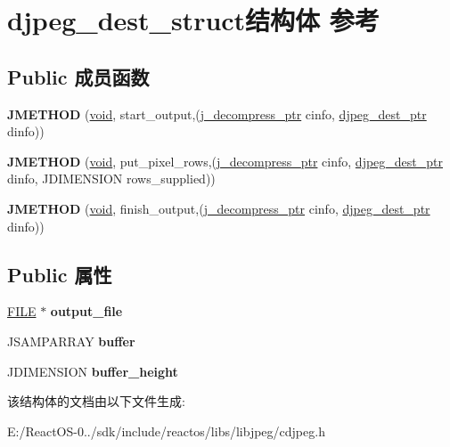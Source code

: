 \hypertarget{structdjpeg__dest__struct}{}\section{djpeg\+\_\+dest\+\_\+struct结构体 参考}
\label{structdjpeg__dest__struct}
\subsection*{Public 成员函数}
\begin{DoxyCompactItemize}
\item 
\mbox{\label{structdjpeg__dest__struct_a387aad15333be251b9fdd4f341e3b50c}} 
{\bfseries J\+M\+E\+T\+H\+OD} (\hyperlink{interfacevoid}{void}, start\+\_\+output,(\hyperlink{structjpeg__decompress__struct}{j\+\_\+decompress\+\_\+ptr} cinfo, \hyperlink{structdjpeg__dest__struct}{djpeg\+\_\+dest\+\_\+ptr} dinfo))
\item 
\mbox{\label{structdjpeg__dest__struct_ab7452265598106468aeb73b63c080024}} 
{\bfseries J\+M\+E\+T\+H\+OD} (\hyperlink{interfacevoid}{void}, put\+\_\+pixel\+\_\+rows,(\hyperlink{structjpeg__decompress__struct}{j\+\_\+decompress\+\_\+ptr} cinfo, \hyperlink{structdjpeg__dest__struct}{djpeg\+\_\+dest\+\_\+ptr} dinfo, J\+D\+I\+M\+E\+N\+S\+I\+ON rows\+\_\+supplied))
\item 
\mbox{\label{structdjpeg__dest__struct_a3a1f7c965ea1dbbb577eb8902e3c893e}} 
{\bfseries J\+M\+E\+T\+H\+OD} (\hyperlink{interfacevoid}{void}, finish\+\_\+output,(\hyperlink{structjpeg__decompress__struct}{j\+\_\+decompress\+\_\+ptr} cinfo, \hyperlink{structdjpeg__dest__struct}{djpeg\+\_\+dest\+\_\+ptr} dinfo))
\end{DoxyCompactItemize}
\subsection*{Public 属性}
\begin{DoxyCompactItemize}
\item 
\mbox{\label{structdjpeg__dest__struct_a5cd2d9d83c2b0b77b30169be5682d8fc}} 
\hyperlink{struct__iobuf}{F\+I\+LE} $\ast$ {\bfseries output\+\_\+file}
\item 
\mbox{\label{structdjpeg__dest__struct_a84d1443492d9c70afae65d6f95410cf4}} 
J\+S\+A\+M\+P\+A\+R\+R\+AY {\bfseries buffer}
\item 
\mbox{\label{structdjpeg__dest__struct_a78eef05ab5286600c995e9df51acf2c1}} 
J\+D\+I\+M\+E\+N\+S\+I\+ON {\bfseries buffer\+\_\+height}
\end{DoxyCompactItemize}


该结构体的文档由以下文件生成\+:\begin{DoxyCompactItemize}
\item 
E\+:/\+React\+O\+S-\/0../sdk/include/reactos/libs/libjpeg/cdjpeg.\+h\end{DoxyCompactItemize}
